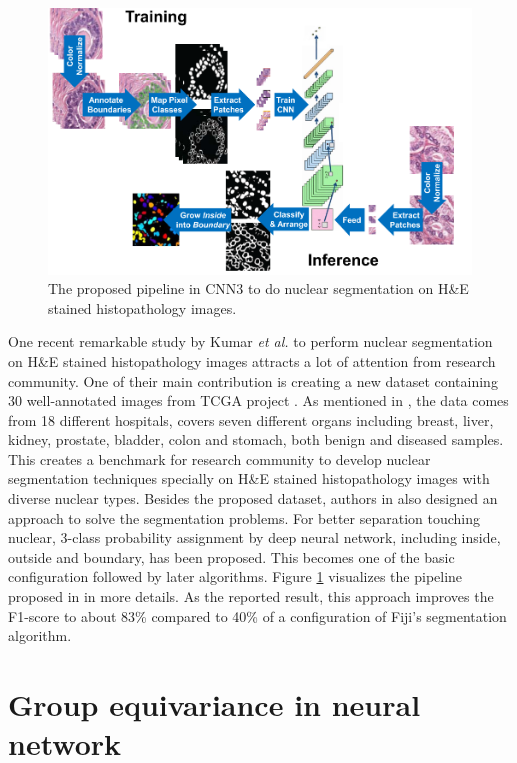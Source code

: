 \begin{figure}[thb]
    \centering
    \includegraphics[width=\textwidth]{resources/3-cnn3.png}
    \caption{The proposed pipeline in CNN3 \cite{he_dataset_kumar} to do nuclear segmentation on H\&E stained histopathology images.}
    \label{fig:cnn3}
\end{figure}

One recent remarkable study by Kumar \textit{et al.} \cite{he_dataset_kumar} to perform nuclear segmentation on H\&E stained histopathology images attracts a lot of attention from research community. One of their main contribution is creating a new dataset containing 30 well-annotated images from TCGA project \cite{tcga}. As mentioned in \cite{he_dataset_kumar}, the data comes from 18 different hospitals, covers seven different organs including breast, liver, kidney, prostate, bladder, colon and stomach, both benign and diseased samples. This creates a benchmark for research community to develop nuclear segmentation techniques specially on H\&E stained histopathology images with diverse nuclear types. Besides the proposed dataset, authors in \cite{he_dataset_kumar} also designed an approach to solve the segmentation problems. For better separation touching nuclear, 3-class probability assignment by deep neural network, including inside, outside and boundary, has been proposed. This becomes one of the basic configuration followed by later algorithms. Figure \ref{fig:cnn3} visualizes the pipeline proposed in \cite{he_dataset_kumar} in more details. As the reported result, this approach \cite{he_dataset_kumar} improves the F1-score to about 83\% compared to 40\% of a configuration of Fiji's \cite{fiji} segmentation algorithm. 

\section{Group equivariance in neural network}

